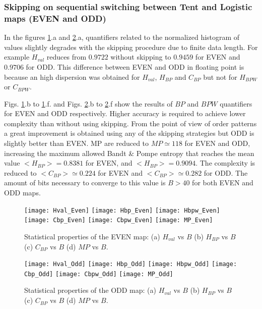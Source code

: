 \subsubsection{Skipping on sequential switching between Tent and Logistic maps (EVEN and ODD)} \label{sssec:skipp}

In the figures \ref{fig:EVEN_QuantiB}.a and \ref{fig:ODD_QuantiB}.a, quantifiers related to the normalized histogram of values slightly degrades with the skipping procedure due to finite data length.
For example $H_{val}$ reduces from $0.9722$ without skipping to $0.9459$ for EVEN and $0.9706$ for ODD. 
This difference between EVEN and ODD in floating point is because an high dispersion was obtained for $H_{val}$, $H_{BP}$ and $C_{BP}$ but not for $H_{BPW}$ or $C_{BPW}$.

Figs. \ref{fig:EVEN_QuantiB}.b to \ref{fig:EVEN_QuantiB}.f. and Figs. \ref{fig:ODD_QuantiB}.b to \ref{fig:ODD_QuantiB}.f show the results of $BP$ and $BPW$ quantifiers for EVEN and ODD respectively.
Higher accuracy is required to achieve lower complexity than without using skipping.
From the point of view of order patterns a great improvement is obtained using any of the skipping strategies but ODD is slightly better than EVEN.
MP are reduced to $MP\simeq 118$ for EVEN and  ODD, increasing the maximum allowed Bandt \& Pompe entropy that reaches the mean value $<H_{BP}> = 0.8381$ for EVEN, and $<H_{BP}> = 0.9094$.
The complexity is reduced to $<C_{BP}>\simeq 0.224$ for EVEN and  $<C_{BP}>\simeq 0.282$ for ODD.
The amount of bits necessary to converge to this value is $B>40$ for both EVEN and ODD maps.

\begin{figure}
	\texttt{[image: Hval\_Even]}
	\texttt{[image: Hbp\_Even]}
	\texttt{[image: Hbpw\_Even]}
	\texttt{[image: Cbp\_Even]}
	\texttt{[image: Cbpw\_Even]}
	\texttt{[image: MP\_Even]}
	\caption{Statistical properties of the EVEN map: (a) $H_{val}$ vs $B$ (b) $H_{BP}$ vs $B$ (c) $C_{BP}$ vs $B$ (d) $MP$ vs $B$.}
	\label{fig:EVEN_QuantiB}
\end{figure}

\begin{figure}
	\texttt{[image: Hval\_Odd]}
	\texttt{[image: Hbp\_Odd]}
	\texttt{[image: Hbpw\_Odd]}
	\texttt{[image: Cbp\_Odd]}
	\texttt{[image: Cbpw\_Odd]}
	\texttt{[image: MP\_Odd]}
	\caption{Statistical properties of the ODD map: (a) $H_{val}$ vs $B$ (b) $H_{BP}$ vs $B$ (c) $C_{BP}$ vs $B$ (d) $MP$ vs $B$.}
	\label{fig:ODD_QuantiB}
	\end{figure}

